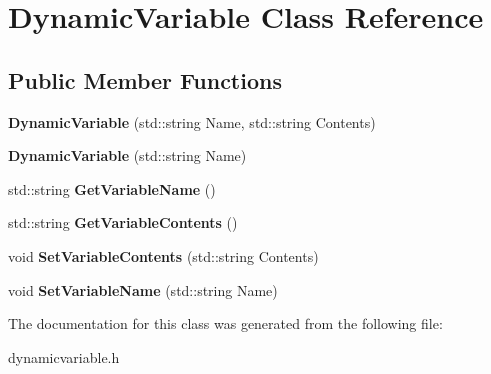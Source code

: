 \hypertarget{classDynamicVariable}{\section{Dynamic\-Variable Class Reference}
\label{classDynamicVariable}
}
\subsection*{Public Member Functions}
\begin{DoxyCompactItemize}
\item 
\hypertarget{classDynamicVariable_a8e38eae3957a9898e185b39890d836b9}{{\bfseries Dynamic\-Variable} (std\-::string Name, std\-::string Contents)}\label{classDynamicVariable_a8e38eae3957a9898e185b39890d836b9}

\item 
\hypertarget{classDynamicVariable_a4c373222540fc9afb4f60c3cd5c3083c}{{\bfseries Dynamic\-Variable} (std\-::string Name)}\label{classDynamicVariable_a4c373222540fc9afb4f60c3cd5c3083c}

\item 
\hypertarget{classDynamicVariable_ae693b792fcc5aa86a12fe7d0316536c4}{std\-::string {\bfseries Get\-Variable\-Name} ()}\label{classDynamicVariable_ae693b792fcc5aa86a12fe7d0316536c4}

\item 
\hypertarget{classDynamicVariable_a55d8bc325247917dbc35d0eb6127a818}{std\-::string {\bfseries Get\-Variable\-Contents} ()}\label{classDynamicVariable_a55d8bc325247917dbc35d0eb6127a818}

\item 
\hypertarget{classDynamicVariable_a5073b6d461882be7b83e7eff0618442c}{void {\bfseries Set\-Variable\-Contents} (std\-::string Contents)}\label{classDynamicVariable_a5073b6d461882be7b83e7eff0618442c}

\item 
\hypertarget{classDynamicVariable_a3f56edd55dd554b8cf822b2d6c16be7f}{void {\bfseries Set\-Variable\-Name} (std\-::string Name)}\label{classDynamicVariable_a3f56edd55dd554b8cf822b2d6c16be7f}

\end{DoxyCompactItemize}


The documentation for this class was generated from the following file\-:\begin{DoxyCompactItemize}
\item 
dynamicvariable.\-h\end{DoxyCompactItemize}
